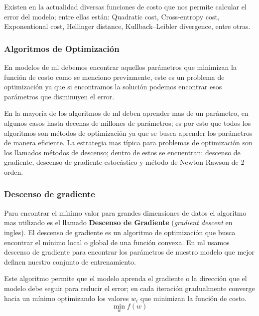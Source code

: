 Existen en la actualidad diversas funciones de costo que nos permite calcular el error del modelo; entre ellas están: Quadratic cost, Cross-entropy cost, Exponentional cost, Hellinger distance, Kullback–Leibler divergence, entre otras.


\subsubsection{Algoritmos de Optimización} 
En modelos de \ac{ml} debemos encontrar aquellos parámetros que minimizan la función de costo como se menciono previamente, este es un problema de optimización ya que si encontramos la solución podemos encontrar esos parámetros que disminuyen el error.

En la mayoría de los algoritmos de \ac{ml} deben aprender mas de un parámetro, en algunos casos hasta decenas de millones de parámetros; es por esto que todos los algoritmos  son métodos de optimización ya que se busca aprender los parámetros de manera eficiente. La estrategia mas típica para problemas de optimización son los llamados métodos de descenso; dentro de estos se encuentran: descenso de gradiente, descenso de gradiente estocástico y método de Newton Rawson de 2 orden.

\subsubsection{Descenso de gradiente}\label{sub:gradient-desc}
Para encontrar el mínimo valor para grandes dimensiones de datos el algoritmo mas utilizado es el llamado \textbf{Descenso de Gradiente} (\textit{gradient descent} en ingles). El descenso de gradiente es un algoritmo de optimización que busca encontrar el mínimo local o global de una función convexa.  En \ac{ml} usamos descenso de gradiente para encontrar los parámetros de nuestro modelo que mejor definen nuestro conjunto de entrenamiento.

Este algoritmo permite que el modelo aprenda el gradiente o la dirección que el modelo debe seguir para reducir el error; en cada iteración gradualmente converge hacia un mínimo optimizando los valores $w_i $ que minimizan la función de costo. $$\min_{w} f(w)$$

